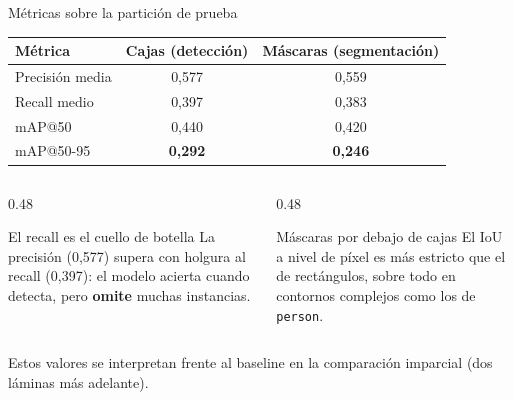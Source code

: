 \documentclass[aspectratio=169,11pt]{beamer}
\begin{document}
\begin{frame}{Métricas sobre la partición de prueba}
  \centering
  \small
  \begin{tabular}{@{}lcc@{}}
    \toprule
    \textbf{Métrica} & \textbf{Cajas (detección)} & \textbf{Máscaras (segmentación)} \\
    \midrule
    Precisión media & 0,577 & 0,559 \\
    Recall medio    & 0,397 & 0,383 \\
    mAP@50          & 0,440 & 0,420 \\
    mAP@50-95       & \textbf{0,292} & \textbf{0,246} \\
    \bottomrule
  \end{tabular}

  \vspace{0.8em}
  \begin{columns}
    \begin{column}{0.48\textwidth}
      \begin{block}{El recall es el cuello de botella}
        \footnotesize
        La precisión (0,577) supera con holgura al recall (0,397): el modelo acierta
        cuando detecta, pero \textbf{omite} muchas instancias.
      \end{block}
    \end{column}
    \begin{column}{0.48\textwidth}
      \begin{block}{Máscaras por debajo de cajas}
        \footnotesize
        El IoU a nivel de píxel es más estricto que el de rectángulos, sobre todo en
        contornos complejos como los de \texttt{person}.
      \end{block}
    \end{column}
  \end{columns}

  \vspace{0.4em}
  {\scriptsize \footnotesize Estos valores se interpretan frente al baseline en la
  comparación imparcial (dos láminas más adelante).}
\end{frame}
\end{document}

